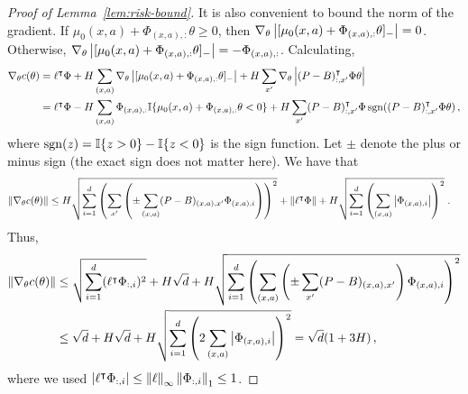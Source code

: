 \documentclass[11pt]{article}
\begin{document}
\begin{proof}[Proof of Lemma~\ref{lem:risk-bound}]
  It is also convenient to bound the norm of the gradient.
If $\mu_0(x,a)+\Phi_{(x,a),:} \theta \ge 0$, then $\nabla_{\theta} \left\vert[\mu_0(x,a)+\Phi_{(x,a),:} \theta]_{-}\right\vert = 0$. Otherwise, $\nabla_{\theta} \left\vert[\mu_0(x,a)+\Phi_{(x,a),:} \theta]_{-}\right\vert = -\Phi_{(x,a),:}$.
Calculating,
\begin{equation}\label{eq:cost_gradient}
\begin{split}
\nabla_{\theta} c(\theta) &= \ell^\intercal \Phi + H \sum_{(x,a)} \nabla_{\theta} \left\vert[\mu_0(x,a)+\Phi_{(x,a),:} \theta]_{-}\right\vert+ H \sum_{x'}\nabla_{\theta} \left\vert (P-B)_{:,x'}^\intercal \Phi \theta\right\vert  \\
&= \ell^\intercal \Phi - H \sum_{(x,a)} \Phi_{(x,a),:} {\mathbb I}{\{\mu_0(x,a)+\Phi_{(x,a),:} \theta < 0\}}+ H \sum_{x'}  (P-B)_{:,x'}^\intercal \Phi \operatorname*{sgn}((P-B)_{:,x'}^\intercal \Phi \theta)   \,,
\end{split}
\end{equation}
where $\operatorname*{sgn}(z) = {\mathbb I}{\{z>0\}} - {\mathbb I}{\{z<0\}} $ is the sign function. Let $\pm$ denote the plus or minus sign (the exact sign does not matter here). We have that
\begin{align*}
\left\Vert\nabla_{\theta} c(\theta)\right\Vert &\le H \sqrt{\sum_{i=1}^d \left(\sum_{x'} \left(\pm\sum_{(x,a)} (P-B)_{(x,a),x'} \Phi_{(x,a),i} \right) \right)^2 } +\left\Vert \ell^\intercal \Phi\right\Vert + H \sqrt{\sum_{i=1}^d \left(\sum_{(x,a)} \left\vert\Phi_{(x,a),i}\right\vert \right)^2 } \; .
\end{align*}
Thus,
\begin{align*}
\left\Vert\nabla_{\theta} c(\theta)\right\Vert &\le \sqrt{\sum_{i=1}^d (\ell^\intercal \Phi_{:,i})^2} + H \sqrt{d} + H \sqrt{\sum_{i=1}^d \left(\sum_{(x,a)} \left(\pm\sum_{x'} (P-B)_{(x,a),x'}  \right) \Phi_{(x,a),i} \right)^2 } \\
&\le \sqrt{d} + H \sqrt{d}  + H \sqrt{\sum_{i=1}^d \left(2 \sum_{(x,a)} \left\vert\Phi_{(x,a),i}\right\vert \right)^2 } =\sqrt{d} (1 + 3 H )  \,,
\end{align*}
where we used $\left\vert \ell^\intercal \Phi_{:,i}\right\vert \le \left\Vert\ell\right\Vert_\infty \left\Vert\Phi_{:,i}\right\Vert_1 \le 1$.
\end{proof}
\end{document}
